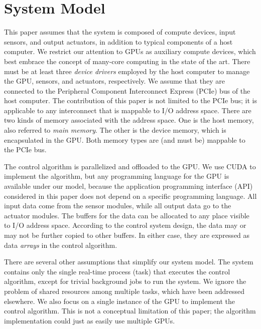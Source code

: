 \section{System Model}
\label{sec:system_model}

This paper assumes that the system is composed of compute devices, input
sensors, and output actuators, in addition to typical components of a
host computer.
We restrict our attention to GPUs as auxiliary compute devices,
which best embrace the concept of many-core computing in the state of
the art.
There must be at least three \textit{device drivers} employed by the
host computer to manage the GPU, sensors, and actuators,
respectively.
We assume that they are connected to the Peripheral Component
Interconnect Express (PCIe) bus of the host computer.
The contribution of this paper is not limited to the PCIe bus; it is
applicable to any interconnect that is mappable to I/O address space.
There are two kinds of memory associated with the address space.
One is the host memory, also referred to \emph{main memory}.
The other is the device memory, which is encapsulated in the GPU.
Both memory types are (and must be) mappable to the PCIe bus.

The control algorithm is parallelized and offloaded to the GPU.
We use CUDA to implement the algorithm, but any programming
language for the GPU is available under our model, because the
application programming interface (API) considered in this paper does
not depend on a specific programming language.
All input data come from the sensor modules, while all output data go to
the actuator modules.
The buffers for the data can be allocated to any place visible to I/O
address space.
According to the control system design, the data may or may not be
further copied to other buffers.
In either case, they are expressed as data \textit{arrays} in the
control algorithm.

There are several other assumptions that simplify our system model.
The system contains only the single real-time process (task) that
executes the control algorithm, except for trivial background jobs to
run the system.
We ignore the problem of shared resources among multiple tasks, which
have been addressed elsewhere.
We also focus on a single instance of the GPU to implement the control
algorithm.
This is not a conceptual limitation of this paper; the algorithm
implementation could just as easily use multiple GPUs.
